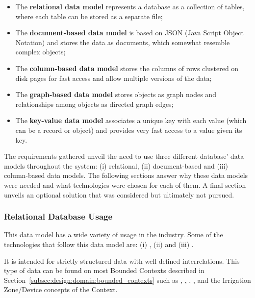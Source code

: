 \begin{itemize}
    \item The \textbf{relational data model} represents a database as a collection of tables,
    where each table can be stored as a separate file; 
    \item The \textbf{document-based data model} is based on JSON (Java Script
    Object Notation) and stores the data as documents, which somewhat resemble
    complex objects; 
    \item The \textbf{column-based data model} stores the columns of rows clustered on disk pages for fast access and allow multiple versions of the data;
    \item The \textbf{graph-based data model} stores objects as graph nodes and relationships among objects as directed graph edges;
    \item The \textbf{key-value data model} associates a unique key with each value (which can be a record or object) and provides very fast access to a value given its key.
\end{itemize}

The requirements gathered unveil the need to use three different database' data models throughout the system: (i) relational, (ii) document-based and (iii) column-based data models. The following sections answer why these data models were needed and what technologies were chosen for each of them. A final section unveils an optional solution that was considered but ultimately not pursued.

\subsubsection{Relational Database Usage}
\label{subsubsec:implementation:decisions:database:relational}

This data model has a wide variety of usage in the industry. Some of the technologies that follow this data model are: (i) , (ii)  and (iii) .

It is intended for strictly structured data with well defined interrelations. This type of data can be found on most Bounded Contexts described in Section~\ref{subsec:design:domain:bounded_contexts} such as , , , ,  and the Irrigation Zone/Device concepts of the  Context.

